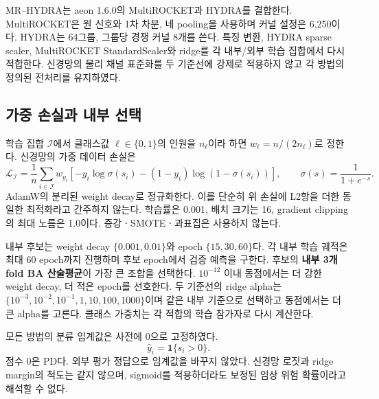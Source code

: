 \documentclass[11pt,a4paper]{article}
\newcommand{\ind}{\mathbf{1}}
\numberwithin{equation}{section}
\begin{document}
MR--HYDRA는 aeon 1.6.0의 MultiROCKET\cite{multirocket}과
HYDRA\cite{hydra}를 결합한다. MultiROCKET은 원 신호와 1차 차분, 네 pooling을
사용하며 커널 설정은 6,250이다. HYDRA는 64그룹, 그룹당 경쟁 커널 8개를 쓴다.
특징 변환, HYDRA sparse scaler, MultiROCKET StandardScaler와 ridge를
각 내부/외부 학습 집합에서 다시 적합한다. 신경망의 물리 채널 표준화를 두
기준선에 강제로 적용하지 않고 각 방법의 정의된 전처리를 유지하였다.

\subsection{가중 손실과 내부 선택}
학습 집합 $\mathcal I$에서 클래스값 $\ell\in\{0,1\}$의 인원을 $n_\ell$이라 하면
$w_\ell=n/(2n_\ell)$로 정한다. 신경망의 가중 데이터 손실은
\begin{equation}
 \mathcal L_{\mathcal I}=\frac1n\sum_{i\in\mathcal I}w_{y_i}
 \left[-y_i\log\sigma(s_i)-(1-y_i)\log(1-\sigma(s_i))\right],
 \qquad\sigma(s)=\frac1{1+e^{-s}}.
\end{equation}
AdamW의 분리된 weight decay로 정규화한다. 이를 단순히 위 손실에 L2항을
더한 동일한 최적화라고 간주하지 않는다. 학습률은 0.001, 배치 크기는 16,
gradient clipping의 최대 노름은 1.0이다. 증강ㆍSMOTEㆍ과표집은 사용하지 않는다.

내부 후보는 weight decay $\{0.001,0.01\}$와 epoch $\{15,30,60\}$다.
각 내부 학습 궤적은 최대 60 epoch까지 진행하며 후보 epoch에서 검증 예측을
구한다. 후보의 \textbf{내부 3개 fold BA 산술평균}이 가장 큰 조합을 선택한다.
$10^{-12}$ 이내 동점에서는 더 강한 weight decay, 더 적은 epoch를 선호한다.
두 기준선의 ridge alpha는 $\{10^{-3},10^{-2},10^{-1},1,10,100,1000\}$이며
같은 내부 기준으로 선택하고 동점에서는 더 큰 alpha를 고른다.
클래스 가중치는 각 적합의 학습 참가자로 다시 계산한다.

모든 방법의 분류 임계값은 사전에 0으로 고정하였다.
\begin{equation}
 \widehat y_i=\ind\{s_i>0\}.\label{eq:threshold}
\end{equation}
점수 0은 PD다. 외부 평가 정답으로 임계값을 바꾸지 않았다.
신경망 로짓과 ridge margin의 척도는 같지 않으며,
sigmoid를 적용하더라도 보정된 임상 위험 확률이라고 해석할 수 없다.
\end{document}
